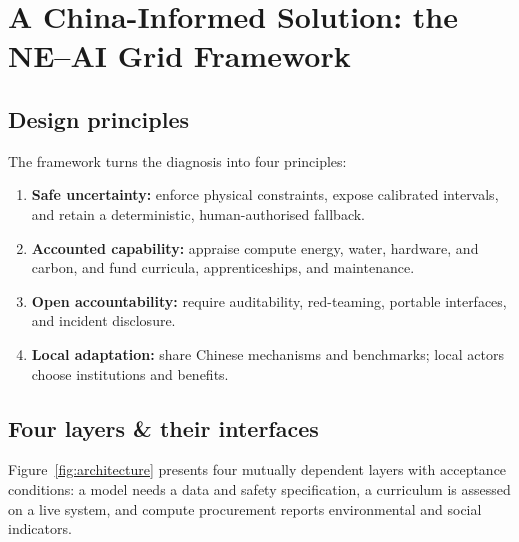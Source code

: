 \documentclass[12pt]{article}
\begin{document}
\section{A China-Informed Solution: the NE--AI Grid Framework}

\subsection{Design principles}
The framework turns the diagnosis into four principles:

\begin{enumerate}
  \item \textbf{Safe uncertainty:} enforce physical constraints, expose calibrated intervals, and retain a deterministic, human-authorised fallback.
  \item \textbf{Accounted capability:} appraise compute energy, water, hardware, and carbon, and fund curricula, apprenticeships, and maintenance.
  \item \textbf{Open accountability:} require auditability, red-teaming, portable interfaces, and incident disclosure.
  \item \textbf{Local adaptation:} share Chinese mechanisms and benchmarks; local actors choose institutions and benefits.
\end{enumerate}

\subsection{Four layers \& their interfaces}
Figure~\ref{fig:architecture} presents four mutually dependent layers with acceptance conditions: a model needs a data and safety specification, a curriculum is assessed on a live system, and compute procurement reports environmental and social indicators.
\end{document}
